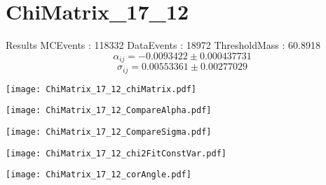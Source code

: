\documentclass[a4paper,12pt]{article}
\begin{document}
\section{ChiMatrix\_17\_12}
\begin{minipage}{0.49\linewidth} Results \newline
MCEvents : 118332\newline
DataEvents : 18972 \newline
ThresholdMass : 60.8918\\
$$\alpha_{ij} = -0.0093422\pm 0.000437731$$
$$\sigma_{ij} = 0.00553361\pm 0.00277029$$
\end{minipage}\hfill
\begin{minipage}{0.49\linewidth} 
\texttt{[image: ChiMatrix\_17\_12\_chiMatrix.pdf]}\\
\end{minipage}
\hfill
\begin{minipage}{0.49\linewidth} 
\texttt{[image: ChiMatrix\_17\_12\_CompareAlpha.pdf]}\\
\end{minipage}
\hfill
\begin{minipage}{0.49\linewidth} 
\texttt{[image: ChiMatrix\_17\_12\_CompareSigma.pdf]}\\
\end{minipage}
\begin{minipage}{0.49\linewidth} 
\texttt{[image: ChiMatrix\_17\_12\_chi2FitConstVar.pdf]}\\
\end{minipage}
\hfill
\begin{minipage}{0.49\linewidth} 
\texttt{[image: ChiMatrix\_17\_12\_corAngle.pdf]}\\
\end{minipage}
\end{document}
